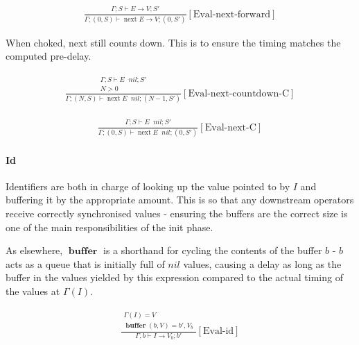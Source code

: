 \documentclass{scrartcl}
\DeclareMathOperator{\nextop}{next}
\DeclareMathOperator{\ceval}{\overset{C}{\rightarrow}}
\DeclareMathOperator{\buffer}{\mathbf{buffer}}
\begin{document}
    \begin{align*}
    \frac{
        \begin{matrix}
        \Gamma; S \vdash E \rightarrow V; S'
        \end{matrix}
    }{
        \Gamma; (0, S) \vdash \nextop E \rightarrow V; (0, S')
    }[\text{Eval-next-forward}]
    \end{align*}
    
    When choked, next still counts down. This is to ensure the timing matches the computed pre-delay.
    
    \begin{align*}
    \frac{
        \begin{matrix}
        \Gamma; S \vdash E \ceval nil; S' \\
        N > 0
        \end{matrix}
    }{
        \Gamma; (N, S) \vdash \nextop E \ceval nil; (N-1, S')
    }[\text{Eval-next-countdown-C}]
    \end{align*}
    
    \begin{align*}
    \frac{
        \begin{matrix}
        \Gamma; S \vdash E \ceval nil; S'
        \end{matrix}
    }{
        \Gamma; (0, S) \vdash \nextop E \ceval nil; (0, S')
    }[\text{Eval-next-C}]
    \end{align*}
    
    \paragraph{Id}
    
    Identifiers are both in charge of looking up the value pointed to by $I$ and buffering it by the appropriate amount. This is so that any downstream operators receive correctly synchronised values - ensuring the buffers are the correct size is one of the main responsibilities of the init phase.
    
    As elsewhere, $\buffer$ is a shorthand for cycling the contents of the buffer $b$ - $b$ acts as a queue that is initially full of $nil$ values, causing a delay as long as the buffer in the values yielded by this expression compared to the actual timing of the values at $\Gamma(I)$.
    
    \begin{align*}
    \frac{
        \begin{matrix}
        \Gamma(I) = V \\
        \buffer(b, V) = b', V_b
        \end{matrix}
    }{
        \Gamma, b \vdash I \rightarrow V_b; b'
    }[\text{Eval-id}]
    \end{align*}
    
\end{document}
